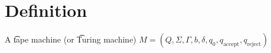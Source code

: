 
\section*{Definition}

A \t{tape machine} (or \t{Turing machine}) $M = (Q, \Sigma , \Gamma , b, \delta , q_0, q_{\text{accept}}, q_{\text{reject}})$

\blankpage